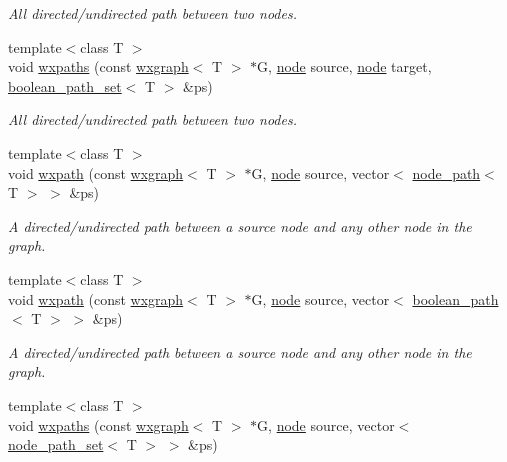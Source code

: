 \begin{DoxyCompactItemize}
\begin{DoxyCompactList}\small\item\em All directed/undirected path between two nodes. \end{DoxyCompactList}\item 
{\footnotesize template$<$class T $>$ }\\void \hyperlink{namespacelgraph_1_1traversal_af4f6d2630d596387b4ba4891c55a3773}{wxpaths} (const \hyperlink{classlgraph_1_1utils_1_1wxgraph}{wxgraph}$<$ T $>$ $\ast$G, \hyperlink{namespacelgraph_1_1utils_ab9c6b34241f0b68372c55f34c460e863}{node} source, \hyperlink{namespacelgraph_1_1utils_ab9c6b34241f0b68372c55f34c460e863}{node} target, \hyperlink{namespacelgraph_1_1utils_aaf50131e15d771a45620336d6e7a77f8}{boolean\+\_\+path\+\_\+set}$<$ T $>$ \&ps)
\begin{DoxyCompactList}\small\item\em All directed/undirected path between two nodes. \end{DoxyCompactList}\item 
{\footnotesize template$<$class T $>$ }\\void \hyperlink{namespacelgraph_1_1traversal_ac7a89afe8623b7e0d90fe4c5441d3e28}{wxpath} (const \hyperlink{classlgraph_1_1utils_1_1wxgraph}{wxgraph}$<$ T $>$ $\ast$G, \hyperlink{namespacelgraph_1_1utils_ab9c6b34241f0b68372c55f34c460e863}{node} source, vector$<$ \hyperlink{classlgraph_1_1utils_1_1node__path}{node\+\_\+path}$<$ T $>$ $>$ \&ps)
\begin{DoxyCompactList}\small\item\em A directed/undirected path between a source node and any other node in the graph. \end{DoxyCompactList}\item 
{\footnotesize template$<$class T $>$ }\\void \hyperlink{namespacelgraph_1_1traversal_af06a18e5ed57978bb1313deb1a32b8a1}{wxpath} (const \hyperlink{classlgraph_1_1utils_1_1wxgraph}{wxgraph}$<$ T $>$ $\ast$G, \hyperlink{namespacelgraph_1_1utils_ab9c6b34241f0b68372c55f34c460e863}{node} source, vector$<$ \hyperlink{classlgraph_1_1utils_1_1boolean__path}{boolean\+\_\+path}$<$ T $>$ $>$ \&ps)
\begin{DoxyCompactList}\small\item\em A directed/undirected path between a source node and any other node in the graph. \end{DoxyCompactList}\item 
{\footnotesize template$<$class T $>$ }\\void \hyperlink{namespacelgraph_1_1traversal_a55b574228440d721aa23669dc221e0f3}{wxpaths} (const \hyperlink{classlgraph_1_1utils_1_1wxgraph}{wxgraph}$<$ T $>$ $\ast$G, \hyperlink{namespacelgraph_1_1utils_ab9c6b34241f0b68372c55f34c460e863}{node} source, vector$<$ \hyperlink{namespacelgraph_1_1utils_a723c115f9865edfab11a90377b9abef4}{node\+\_\+path\+\_\+set}$<$ T $>$ $>$ \&ps)

\end{DoxyCompactItemize}
